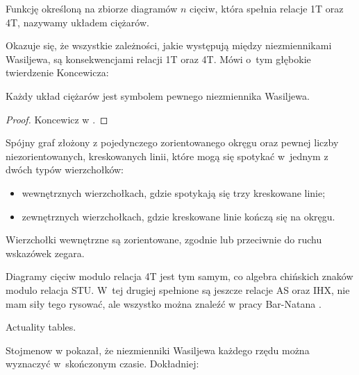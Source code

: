\begin{definition}
    Funkcję określoną na zbiorze diagramów $n$ cięciw, która spełnia relacje 1T oraz 4T, nazywamy układem ciężarów.
\end{definition}

Okazuje się, że wszystkie zależności, jakie występują między niezmiennikami Wasiljewa, są konsekwencjami relacji 1T oraz 4T.
Mówi o~tym głębokie twierdzenie Koncewicza:

\begin{proposition}
    Każdy układ ciężarów jest symbolem pewnego niezmiennika Wasiljewa. %
\end{proposition}

\begin{proof}
    Koncewicz w \cite{kontsevich93}. %
\end{proof}

\begin{definition}
    Spójny graf złożony z pojedynczego zorientowanego okręgu oraz pewnej liczby niezorientowanych, kreskowanych linii, które mogą się spotykać w~jednym z dwóch typów wierzchołków:
    \begin{itemize}
        \item wewnętrznych wierzchołkach, gdzie spotykają się trzy kreskowane linie;
        \item zewnętrznych wierzchołkach, gdzie kreskowane linie kończą się na okręgu.
    \end{itemize}
    Wierzchołki wewnętrzne są zorientowane, zgodnie lub przeciwnie do ruchu wskazówek zegara.
\end{definition}

Diagramy cięciw modulo relacja 4T jest tym samym, co algebra chińskich znaków modulo relacja STU.
%
W~tej drugiej spełnione są jeszcze relacje AS oraz IHX, nie mam siły tego rysować, ale wszystko można znaleźć w pracy Bar-Natana \cite{barnatan_95}.

\begin{tobedone}
    Actuality tables.
\end{tobedone}

Stojmenow w \cite{stoimenow001} pokazał, że niezmienniki Wasiljewa każdego rzędu można wyznaczyć w~skończonym czasie.
Dokładniej:


